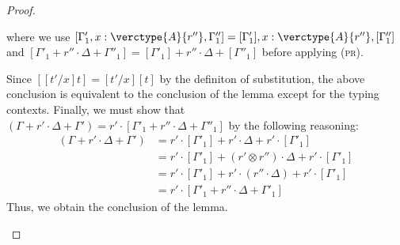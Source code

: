 \begin{proof}
\begin{itemize}
\begin{center}
\begin{minipage}{.6\linewidth}
{        }
    \end{minipage}
\end{center}
where we use $[\Gamma'_1, x:\verctype{A}{r''}, \Gamma''_1] = [\Gamma'_1], x:\verctype{A}{r''}, [\Gamma''_1]$ and $[\Gamma'_1 + r''\cdot\Delta + \Gamma''_1] = [\Gamma'_1] + r''\cdot\Delta + [\Gamma''_1]$ before applying (\textsc{pr}).\par
Since $[[t'/x]t] = [t'/x][t]$ by the definiton of substitution, the above conclusion is equivalent to the conclusion of the lemma except for the typing contexts.
Finally, we must show that $(\Gamma + r'\cdot\Delta + \Gamma') = r'\cdot[\Gamma'_1 + r''\cdot\Delta + \Gamma''_1]$ by the following reasoning:
\begin{align*}
(\Gamma + r'\cdot\Delta + \Gamma')
&= r'\cdot[\Gamma'_1] + r'\cdot\Delta + r'\cdot[\Gamma'_1]\tag{$\because$ $\Gamma = (r'\cdot[\Gamma'_1])$ \& $\Gamma' = (r'\cdot[\Gamma''_1])$}\\
&= r'\cdot[\Gamma'_1] + (r'\otimes r'')\cdot\Delta + r'\cdot[\Gamma'_1] \tag{$\because$ $r''\sqsubseteq r'$}\\
&= r'\cdot[\Gamma'_1] + r'\cdot ( r''\cdot\Delta) + r'\cdot[\Gamma'_1] \tag{$\because$ $\otimes$ associativity}\\
&= r'\cdot[\Gamma'_1 + r''\cdot\Delta + \Gamma'_1] \tag{$\because$ $\cdot$ distributive law over $+$}
\end{align*}
Thus, we obtain the conclusion of the lemma.
\\



\end{itemize}
\end{proof}
